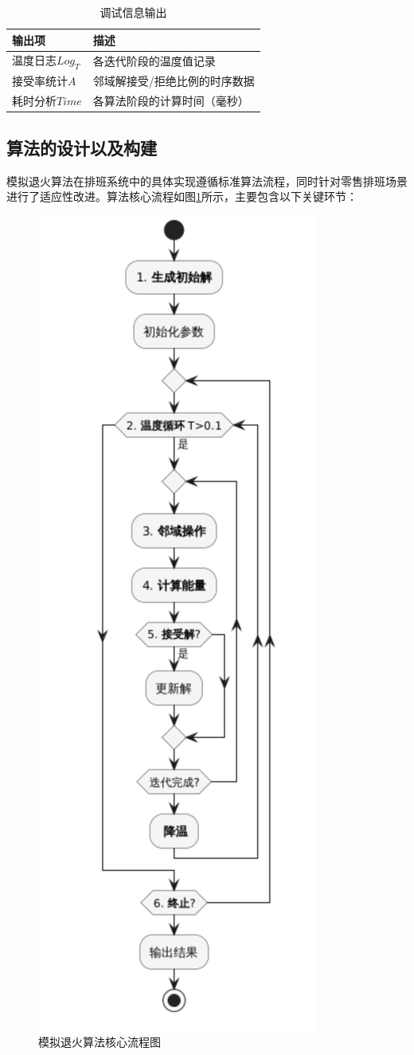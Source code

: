 \documentclass{ctexart}
\begin{document}
\begin{table}[H]
    \centering
    \caption{调试信息输出}
    \label{tab:debug-outputs}
    \begin{tabular}{ll}
    \toprule
    输出项 & 描述 \\
    \midrule
    温度日志$Log_T$ & 各迭代阶段的温度值记录 \\
    接受率统计$A$ & 邻域解接受/拒绝比例的时序数据 \\
    耗时分析$Time$ & 各算法阶段的计算时间（毫秒） \\
    \bottomrule
    \end{tabular}
\end{table}

\subsection{算法的设计以及构建}
模拟退火算法在排班系统中的具体实现遵循标准算法流程，同时针对零售排班场景进行了适应性改进。算法核心流程如图\ref{fig:sa-flowchart}所示，主要包含以下关键环节：

\begin{figure}[H]
    \centering
    \includegraphics[width=0.3\linewidth]{./source/模拟退火算法核心流程图.png}
    \caption{模拟退火算法核心流程图}
    \label{fig:sa-flowchart}
\end{figure}
\end{document}
